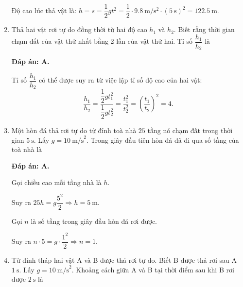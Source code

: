 \begin{enumerate}[label=\bfseries Câu \arabic*:,leftmargin=1.5cm]
{		Độ cao lúc thả vật là:
		$h=s=\dfrac{1}{2}gt^2=\dfrac{1}{2}\cdot\SI{9.8}{\meter/\second^2}\cdot(\SI{5}{\second})^2=\SI{122.5}{\meter}.$
	}
	
	\item {}
	
	
	{Thả hai vật rơi tự do đồng thời từ hai độ cao $h_1$ và $h_2$. Biết rằng thời gian chạm đất của vật thứ nhất bằng 2 lần của vật thứ hai. Tỉ số $\dfrac{h_1}{h_2}$ là
	}
	\hideall
	{	\textbf{Đáp án: A.}
		
		Tỉ số $\dfrac{h_1}{h_2}$ có thể được suy ra từ việc lập tỉ số độ cao của hai vật: $$\dfrac{h_1}{h_2}=\dfrac{\dfrac{1}{2}gt_1^2}{\dfrac{1}{2}gt_2^2}=\dfrac{t_1^2}{t_2^2}=\left( \dfrac{t_1}{t_2}\right)^2=4.$$
	}
	
	\item {}
	
	
	{Một hòn đá thả rơi tự do từ đỉnh toà nhà $25$ tầng nó chạm đất trong thời gian $5\ \text{s}$. Lấy $g=10\ \text{m/s}^2$. Trong giây đầu tiên hòn đá đã đi qua số tầng của toà nhà là
	}
	\hideall
	{	\textbf{Đáp án: A.}
		
		Gọi chiều cao mỗi tầng nhà là $h$. 
		
		Suy ra $25h=g\dfrac{5^2}{2}\Rightarrow h=5\ \text{m}$.
		
		Gọi $n$ là số tầng trong giây đầu hòn đá rơi được.
		
		Suy ra $n\cdot 5=g\cdot \dfrac{1^2}{2}\Rightarrow n=1$.
	}
	\item {}
	
	
	{Từ đỉnh tháp hai vật A và B được thả rơi tự do. Biết B được thả rơi sau A $1\ \text{s}$. Lấy $g=10\ \text{m/s}^2$. Khoảng cách giữa A và B tại thời điểm sau khi B rơi được $2\ \text{s}$ là
		
}
\end{enumerate}
